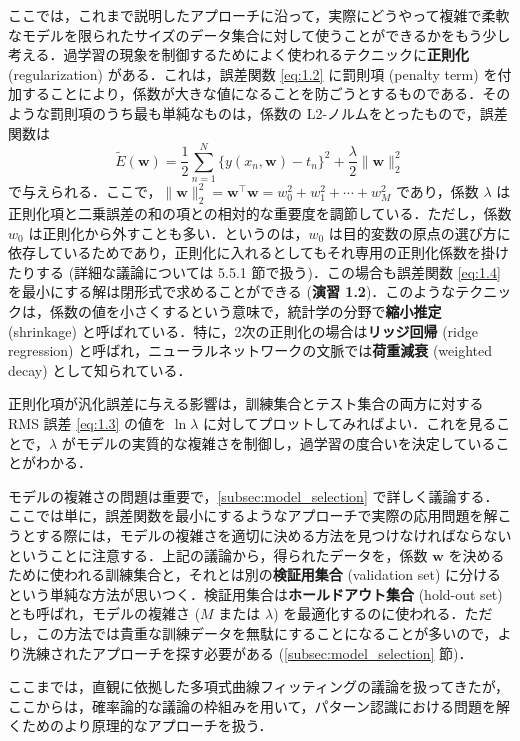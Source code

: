 \documentclass[uplatex,a4paper,oneside,openany,dvipdfmx]{jsarticle}
\numberwithin{equation}{section}
\theoremstyle{mystyle} %
\newcommand{\tb}[1]{\textbf{#1}}
\newcommand{\bs}[1]{\boldsymbol{#1}}
\newcommand{\norm}[1]{\|#1\|}
\begin{document}
ここでは，これまで説明したアプローチに沿って，実際にどうやって複雑で柔軟なモデルを限られたサイズのデータ集合に対して使うことができるかをもう少し考える．過学習の現象を制御するためによく使われるテクニックに\tb{正則化} (regularization) がある．これは，誤差関数 \eqref{eq:1.2} に罰則項 (penalty term) を付加することにより，係数が大きな値になることを防ごうとするものである．そのような罰則項のうち最も単純なものは，係数の L2-ノルムをとったもので，誤差関数は
\begin{equation} \label{eq:1.4}
    \widetilde{E}(\bs{w}) = \frac{1}{2} \sum_{n=1}^{N} \{y(x_{n},\bs{w}) - t_{n}\}^{2} + \frac{\lambda}{2} \norm{\bs{w}}_{2}^{2}
\end{equation}
で与えられる．ここで，$\norm{\bs{w}}_{2}^{2} = \bs{w}^{\top} \bs{w} = w_{0}^{2} + w_{1}^{2} + \cdots + w_{M}^{2}$ であり，係数 $\lambda$ は正則化項と二乗誤差の和の項との相対的な重要度を調節している．ただし，係数 $w_{0}$ は正則化から外すことも多い．というのは，$w_{0}$ は目的変数の原点の選び方に依存しているためであり，正則化に入れるとしてもそれ専用の正則化係数を掛けたりする (詳細な議論については 5.5.1 節で扱う)．この場合も誤差関数 \eqref{eq:1.4} を最小にする解は閉形式で求めることができる (\tb{演習 1.2})．このようなテクニックは，係数の値を小さくするという意味で，統計学の分野で\tb{縮小推定} (shrinkage) と呼ばれている．特に，2次の正則化の場合は\tb{リッジ回帰} (ridge regression) と呼ばれ，ニューラルネットワークの文脈では\tb{荷重減衰} (weighted decay) として知られている．

正則化項が汎化誤差に与える影響は，訓練集合とテスト集合の両方に対する RMS 誤差 \eqref{eq:1.3} の値を $\ln \lambda$ に対してプロットしてみればよい．これを見ることで，$\lambda$ がモデルの実質的な複雑さを制御し，過学習の度合いを決定していることがわかる．

モデルの複雑さの問題は重要で，\ref{subsec:model_selection} で詳しく議論する．ここでは単に，誤差関数を最小にするようなアプローチで実際の応用問題を解こうとする際には，モデルの複雑さを適切に決める方法を見つけなければならないということに注意する．上記の議論から，得られたデータを，係数 $\bs{w}$ を決めるために使われる訓練集合と，それとは別の\tb{検証用集合} (validation set) に分けるという単純な方法が思いつく．検証用集合は\tb{ホールドアウト集合} (hold-out set) とも呼ばれ，モデルの複雑さ ($M$ または $\lambda$) を最適化するのに使われる．ただし，この方法では貴重な訓練データを無駄にすることになることが多いので，より洗練されたアプローチを探す必要がある (\ref{subsec:model_selection} 節)．

ここまでは，直観に依拠した多項式曲線フィッティングの議論を扱ってきたが，ここからは，確率論的な議論の枠組みを用いて，パターン認識における問題を解くためのより原理的なアプローチを扱う．
\end{document}
